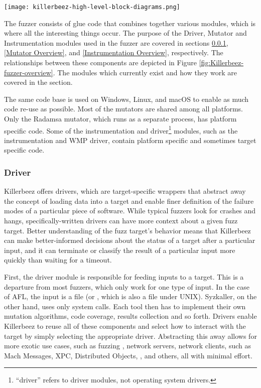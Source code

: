 \begin{figure*}[!ht]
\centering
\texttt{[image: killerbeez-high-level-block-diagrams.png]}
\caption{Killerbeez Fuzzer Overview}
\label{fig:Killerbeez-fuzzer-overview}
\end{figure*}

The fuzzer consists of glue code that combines together various
modules, which is where all the interesting things occur. The purpose of
the Driver, Mutator and Instrumentation modules used in the fuzzer are covered in sections
\ref{Driver Overview}, \ref{Mutator Overview}, and
\ref{Instrumentation Overview}, respectively.  The relationships between these components are depicted in Figure \ref{fig:Killerbeez-fuzzer-overview}. The modules which currently
exist and how they work are covered in the 
section.

The same code base is used on Windows, Linux, and macOS to enable as much code
re-use as possible.  Most of the mutators are shared among all platforms.
Only the Radamsa mutator, which runs as a separate process, has platform specific code.
Some of the instrumentation and driver\footnote{
``driver'' refers to driver modules, not operating system drivers.}
modules, such as the \IPT{} instrumentation and WMP driver, contain platform specific and sometimes target specific code.

\subsubsection{Driver} \label{Driver Overview}
Killerbeez offers drivers, which are target-specific wrappers that abstract
away the concept of loading data into a target and enable finer
definition of the failure modes of a particular piece of software. While
typical fuzzers look for crashes and hangs, specifically-written drivers can
have more context about a given fuzz target.  Better understanding of the fuzz
target's behavior means that Killerbeez can make better-informed decisions
about the status of a target after a particular input, and it can terminate or
classify the result of a particular input more quickly than waiting for a
timeout.

First, the driver module is responsible for feeding inputs to a target.  This
is a departure from most fuzzers, which only work for one type of input.  In
the case of AFL, the input is a file (or \stdin{}, which is also a file under
UNIX).  Syzkaller\cite{syzkaller}, on the other hand, uses only system calls.
Each tool then has to implement their own mutation algorithms, code coverage,
results collection and so forth. Drivers enable Killerbeez to reuse all of
these components and select how to interact with the target by simply selecting
the appropriate driver.  Abstracting this away allows for more exotic use
cases, such as fuzzing \IOCTLs{}, network servers, network clients, \IPC{} such as
Mach Messages, XPC, Distributed Objects, \COM{}, and others, all with minimal
effort.

